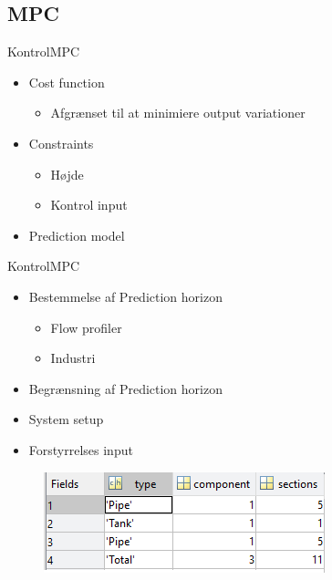 \subsection{MPC}

\begin{frame}{Kontrol}{MPC}
    \vfill\vfill\centering
\begin{itemize}
	\item Cost function
	\begin{itemize}
		\item Afgrænset til at minimiere output variationer
	\end{itemize}
	\item Constraints
	\begin{itemize}
		\item Højde
		\item Kontrol input
	\end{itemize}
	\item Prediction model
\end{itemize}
\vfill\vfill
\end{frame}





\begin{frame}{Kontrol}{MPC}
  \vfill\vfill\centering



      \begin{minipage}[t]{0.48\linewidth}
    \begin{itemize}
    	\item Bestemmelse af Prediction horizon
    	\begin{itemize}
    		\item Flow profiler
    		\item Industri 
    	\end{itemize}
    	\item Begrænsning af Prediction horizon
    	\item System setup
    	\item Forstyrrelses input
    \end{itemize}   
\end{minipage}\hfill
\begin{minipage}[t]{0.48\linewidth}
\begin{figure}[!h]
\centering
\includegraphics[width=0.97 \textwidth]{figures/mpc_system_setup}
\label{fig:mpc_system_setup}
\end{figure}

\end{minipage}


\vfill\vfill
\end{frame}

